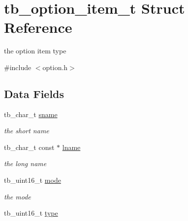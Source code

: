 \hypertarget{structtb__option__item__t}{\section{tb\-\_\-option\-\_\-item\-\_\-t Struct Reference}
\label{structtb__option__item__t}
}


the option item type  




{\ttfamily \#include $<$option.\-h$>$}

\subsection*{Data Fields}
\begin{DoxyCompactItemize}
\item 
\hypertarget{structtb__option__item__t_a9a9e537fdba2f842ddb03528af6e494b}{tb\-\_\-char\-\_\-t \hyperlink{structtb__option__item__t_a9a9e537fdba2f842ddb03528af6e494b}{sname}}\label{structtb__option__item__t_a9a9e537fdba2f842ddb03528af6e494b}

\begin{DoxyCompactList}\small\item\em the short name \end{DoxyCompactList}\item 
\hypertarget{structtb__option__item__t_ae88a55c5e17f17fb805a82c5e2763a0c}{tb\-\_\-char\-\_\-t const $\ast$ \hyperlink{structtb__option__item__t_ae88a55c5e17f17fb805a82c5e2763a0c}{lname}}\label{structtb__option__item__t_ae88a55c5e17f17fb805a82c5e2763a0c}

\begin{DoxyCompactList}\small\item\em the long name \end{DoxyCompactList}\item 
\hypertarget{structtb__option__item__t_a3df0cf9227201e58e6ccbb121b40d698}{tb\-\_\-uint16\-\_\-t \hyperlink{structtb__option__item__t_a3df0cf9227201e58e6ccbb121b40d698}{mode}}\label{structtb__option__item__t_a3df0cf9227201e58e6ccbb121b40d698}

\begin{DoxyCompactList}\small\item\em the mode \end{DoxyCompactList}\item 
\hypertarget{structtb__option__item__t_a1db9d32cf3691f00d2a5d7d981a9d9c6}{tb\-\_\-uint16\-\_\-t \hyperlink{structtb__option__item__t_a1db9d32cf3691f00d2a5d7d981a9d9c6}{type}}\label{structtb__option__item__t_a1db9d32cf3691f00d2a5d7d981a9d9c6}


\end{DoxyCompactItemize}
